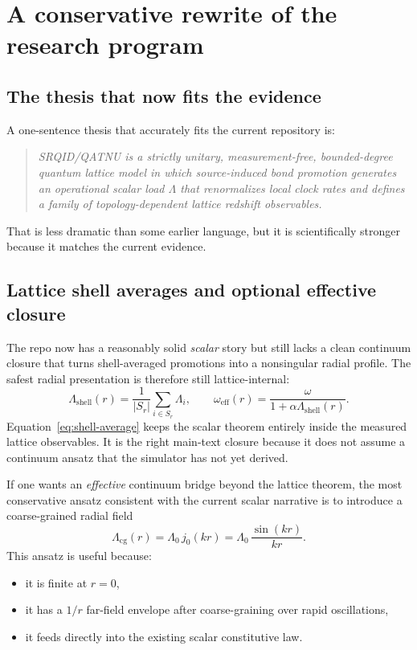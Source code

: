 \documentclass[11pt]{article}
\begin{document}
\section{A conservative rewrite of the research program}

\subsection{The thesis that now fits the evidence}

A one-sentence thesis that accurately fits the current repository is:

\begin{quote}
\emph{SRQID/QATNU is a strictly unitary, measurement-free, bounded-degree quantum lattice model in which source-induced bond promotion generates an operational scalar load $\Lambda$ that renormalizes local clock rates and defines a family of topology-dependent lattice redshift observables.}
\end{quote}

That is less dramatic than some earlier language, but it is scientifically stronger because it matches the current evidence.

\subsection{Lattice shell averages and optional effective closure}

The repo now has a reasonably solid \emph{scalar} story but still lacks a clean continuum closure that turns shell-averaged promotions into a nonsingular radial profile. The safest radial presentation is therefore still lattice-internal:
\begin{equation}
\Lambda_{\mathrm{shell}}(r)
=
\frac{1}{|S_r|}\sum_{i\in S_r}\Lambda_i,
\qquad
\omega_{\mathrm{eff}}(r)
=
\frac{\omega}{1+\alpha \Lambda_{\mathrm{shell}}(r)}.
\label{eq:shell-average}
\end{equation}
Equation~\eqref{eq:shell-average} keeps the scalar theorem entirely inside the measured lattice observables. It is the right main-text closure because it does not assume a continuum ansatz that the simulator has not yet derived.

If one wants an \emph{effective} continuum bridge beyond the lattice theorem, the most conservative ansatz consistent with the current scalar narrative is to introduce a coarse-grained radial field
\begin{equation}
\Lambda_{\mathrm{cg}}(r)
=
\Lambda_0\,j_0(kr)
=
\Lambda_0\,\frac{\sin(kr)}{kr}.
\label{eq:j0}
\end{equation}
This ansatz is useful because:
\begin{itemize}
    \item it is finite at $r=0$,
    \item it has a $1/r$ far-field envelope after coarse-graining over rapid oscillations,
    \item it feeds directly into the existing scalar constitutive law.
\end{itemize}
\end{document}
